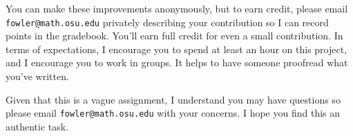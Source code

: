\documentclass{homework}
\begin{document}
You can make these improvements anonymously, but to earn credit,
please email \texttt{fowler@math.osu.edu} privately describing your
contribution so I can record points in the gradebook.  You'll earn
full credit for even a small contribution.  In terms of expectations,
I encourage you to spend at least an hour on this project, and I
encourage you to work in groups.  It helps to have someone proofread
what you've written.

Given that this is a vague assignment, I understand you may have
questions so please email \texttt{fowler@math.osu.edu} with your
concerns.  I hope you find this an authentic task.
\end{document}
